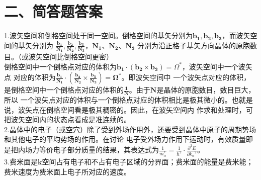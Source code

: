 \documentclass[UTF8]{ctexart}
\begin{document}
\section*{\bfseries 二、简答题答案}
1.波矢空间和倒格空间处于同一空间。倒格空间的基矢分别为$\bm{b_1},\bm{b_2},\bm{b_3}$，而波矢空间的基矢分别为
$\bm{\frac{b_1}{N_1}},\bm{\frac{b_2}{N_2}},\bm{\frac{b_3}{N_3}}$，$\bm{N_1}$、$\bm{N_2}$、$\bm{N_3}$
分别为沿正格子基矢方向晶体的原胞数目。（或波矢空间比倒格空间更密）\\
倒格空间中一个倒格点对应的体积为$\bm{b_1}\cdot(\bm{b_2}\times\bm{b_3})=\Omega^*$，波矢空间中一个波矢点
对应的体积为$\bm{\frac{b_1}{N_1}}\cdot(\bm{\frac{b_2}{N_2}}\times\bm{\frac{b_3}{N_3}})=\bm{\Omega^*}$。即波矢空间中
一个波矢点对应的体积，是倒格空间中一个倒格点对应的体积的$\bm{\frac{1}{N}}$。由于$\bm{N}$是晶体的原胞数目，数目巨大，所以
一个波矢点对应的体积与一个倒格点对应的体积相比是极其微小的。也就是说，波矢点在倒格空间看是极其稠密的。因此，在波矢空间内
作求和处理时，可把波矢空间内的状态点看成是准连续的。\\
2.晶体中的电子（或空穴）除了受到外场作用外，还要受到晶体中原子的周期势场和其他电子的平均势场的作用。在讨论
电子受外场力作用下运动时，有效质量即是把内场力等价电子部分质量的结果，其表达式为$\frac{1}{m_\alpha^*}=\frac{1}{\hbar^2}
\cdot\frac{\partial^2E}{\partial{k_\alpha}^2}$。\\
3.费米面是$\bm{k}$空间占有电子和不占有电子区域的分界面；费米面的能量是费米能；费米速度为费米面上电子所对应的速度。\\
\end{document}
